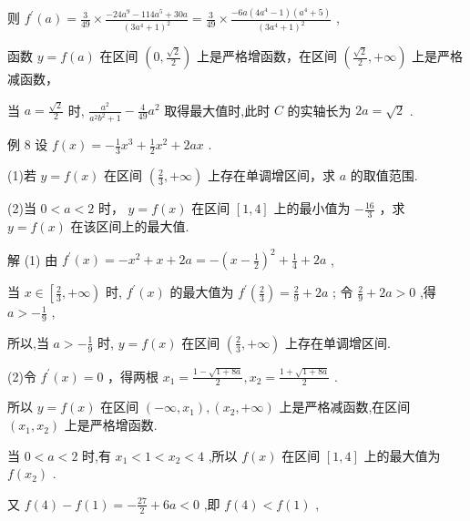 \documentclass[10pt]{article}
\begin{document}
则 \({f}^{\prime }\left( a\right)  = \frac{3}{49} \times  \frac{-{24}{a}^{9} - {114}{a}^{5} + {30a}}{{\left( 3{a}^{4} + 1\right) }^{2}} = \frac{3}{49} \times  \frac{-{6a}\left( {4{a}^{4} - 1}\right) \left( {{a}^{4} + 5}\right) }{{\left( 3{a}^{4} + 1\right) }^{2}}\) ,

函数 \(y = f\left( a\right)\) 在区间 \(\left( {0,\frac{\sqrt{2}}{2}}\right)\) 上是严格增函数，在区间 \(\left( {\frac{\sqrt{2}}{2}, + \infty }\right)\) 上是严格减函数，

当 \(a = \frac{\sqrt{2}}{2}\) 时, \(\frac{{a}^{2}}{{a}^{2}{b}^{2} + 1} - \frac{4}{49}{a}^{2}\) 取得最大值时,此时 \(C\) 的实轴长为 \({2a} = \sqrt{2}\) .

例 8 设 \(f\left( x\right)  =  - \frac{1}{3}{x}^{3} + \frac{1}{2}{x}^{2} + {2ax}\) .

(1)若 \(y = f\left( x\right)\) 在区间 \(\left( {\frac{2}{3}, + \infty }\right)\) 上存在单调增区间，求 \(a\) 的取值范围.

(2)当 \(0 < a < 2\) 时， \(y = f\left( x\right)\) 在区间 \(\left\lbrack  {1,4}\right\rbrack\) 上的最小值为 \(- \frac{16}{3}\) ，求 \(y = f\left( x\right)\) 在该区间上的最大值.

解 (1) 由 \({f}^{\prime }\left( x\right)  =  - {x}^{2} + x + {2a} =  - {\left( x - \frac{1}{2}\right) }^{2} + \frac{1}{4} + {2a}\) ,

当 \(x \in  \left\lbrack  {\frac{2}{3}, + \infty }\right)\) 时, \({f}^{\prime }\left( x\right)\) 的最大值为 \({f}^{\prime }\left( \frac{2}{3}\right)  = \frac{2}{9} + {2a}\) ; 令 \(\frac{2}{9} + {2a} > 0\) ,得 \(a >  - \frac{1}{9}\) ,

所以,当 \(a >  - \frac{1}{9}\) 时, \(y = f\left( x\right)\) 在区间 \(\left( {\frac{2}{3}, + \infty }\right)\) 上存在单调增区间.

(2)令 \({f}^{\prime }\left( x\right)  = 0\) ，得两根 \({x}_{1} = \frac{1 - \sqrt{1 + {8a}}}{2},{x}_{2} = \frac{1 + \sqrt{1 + {8a}}}{2}\) .

所以 \(y = f\left( x\right)\) 在区间 \(\left( {-\infty ,{x}_{1}}\right) ,\left( {{x}_{2}, + \infty }\right)\) 上是严格减函数,在区间 \(\left( {{x}_{1},{x}_{2}}\right)\) 上是严格增函数.

当 \(0 < a < 2\) 时,有 \({x}_{1} < 1 < {x}_{2} < 4\) ,所以 \(f\left( x\right)\) 在区间 \(\left\lbrack  {1,4}\right\rbrack\) 上的最大值为 \(f\left( {x}_{2}\right)\) .

又 \(f\left( 4\right)  - f\left( 1\right)  =  - \frac{27}{2} + {6a} < 0\) ,即 \(f\left( 4\right)  < f\left( 1\right)\) ,
\end{document}
